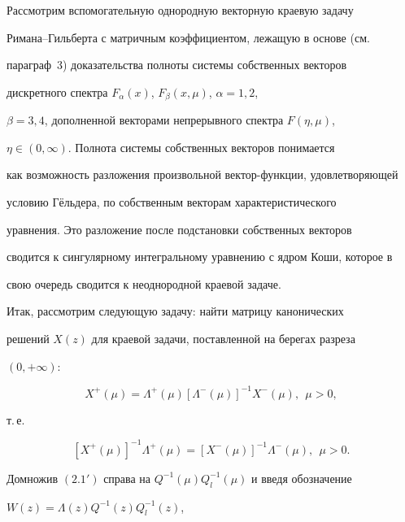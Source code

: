  


Рассмотрим вспомогательную однородную векторную краевую задачу 


Римана--Гильберта с матричным коэффициентом, лежащую в основе (см. 


параграф~3) доказательства полноты системы собственных векторов 


дискретного спектра $F_\alpha(x)$, $F_\beta(x,\mu)$, $\alpha=1,2$, 


$\beta=3,4$, дополненной векторами непрерывного спектра $F(\eta,\mu)$, 


$\eta\in(0,\infty)$. Полнота системы собственных векторов понимается 


как возможность разложения произвольной вектор-функции, удовлетворяющей 


условию Г\"ельдера, по собственным векторам характеристического 


уравнения. Это разложение после подстановки собственных векторов 


сводится к сингулярному интегральному уравнению с ядром Коши, которое в 


свою очередь сводится к неоднородной краевой задаче. 


 


Итак, рассмотрим следующую задачу: найти матрицу канонических 


решений $X(z)$ для краевой задачи, поставленной на берегах разреза 


$(0,+\infty)$: 


\begin{equation} 


X^+(\mu)=\Lambda^+(\mu)[\Lambda^-(\mu)]^{-1}X^-(\mu),\ \ \mu>0, 


\end{equation} 


т.\,е. 


\begin{equation} 


[X^+(\mu)]^{-1}\Lambda^+(\mu)=[X^-(\mu)]^{-1} 


\Lambda^-(\mu),\ \ \mu>0. \tag{2.1$'$} 


\end{equation} 


 


Домножив $(2.1')$ справа на $Q^{-1}(\mu)Q^{-1}_l(\mu)$ и введя обозначение 


$W(z)=\Lambda(z)Q^{-1}(z)Q^{-1}_l(z)$, 


